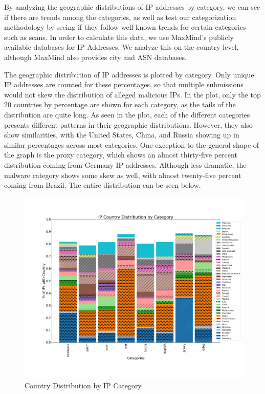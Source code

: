 
By analyzing the geographic distributions of IP addresses by category, we can see if there are trends among the categories, as well as test our categorization methodology by seeing if they follow well-known trends for certain categories such as scans. In order to calculate this data, we use MaxMind's publicly available databases for IP Addresses. We analyze this on the country level, although MaxMind also provides city and ASN databases.

The geographic distribution of IP addresses is plotted by category. Only unique IP addresses are counted for these percentages, so that multiple submissions would not skew the distribution of alleged malicious IPs. In the plot, only the top 20 countries by percentage are shown for each category, as the tails of the distribution are quite long. As seen in the plot, each of the different categories presents different patterns in their geographic distributions. However, they also show similarities, with the United States, China, and Russia showing up in similar percentages across most categories. One exception to the general shape of the graph is the proxy category, which shows an almost thirty-five percent distribution coming from Germany IP addresses. Although less dramatic, the malware category shows some skew as well, with almost twenty-five percent coming from Brazil. The entire distribution can be seen below.
\begin{figure}[h]
\label{Table 16: Geographic Location Distribution: Country}
\includegraphics[width=\columnwidth]{images/categoryGeoIP.png}
\caption{Country Distribution by IP Category}
\end{figure}

